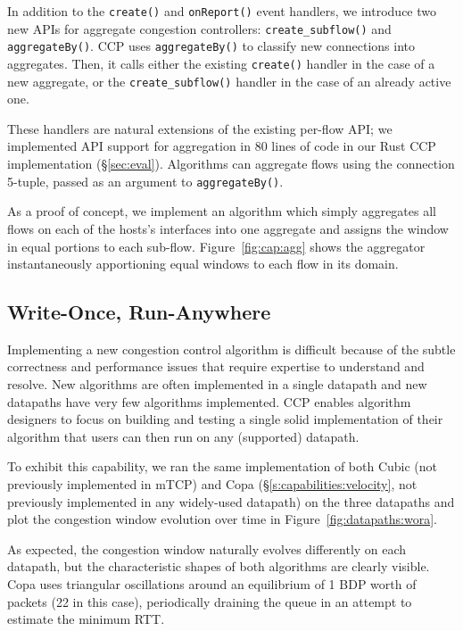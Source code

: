 %

 In addition to the \texttt{create()} and \texttt{onReport()} event handlers, we introduce two new APIs for aggregate congestion controllers: \texttt{create\_subflow()} and \texttt{aggregateBy()}.
CCP uses \texttt{aggregateBy()} to classify new connections into aggregates. Then, it calls either the existing \texttt{create()} handler in the case of a new aggregate, or the \texttt{create\_subflow()} handler in the case of an already active one.

These handlers are natural extensions of the existing per-flow API; we implemented API support for aggregation in $80$ lines of code in our Rust CCP implementation (\S\ref{sec:eval}).
Algorithms can aggregate flows using the connection 5-tuple, passed as an argument to \texttt{aggregateBy()}.

As a proof of concept, we implement an algorithm which simply aggregates all flows on each of the hosts's interfaces into one aggregate and assigns the window in equal portions to each sub-flow.
Figure~\ref{fig:cap:agg} shows the aggregator instantaneously apportioning equal windows to each flow in its domain.

\subsection{Write-Once, Run-Anywhere}
\label{s:capabilities:wora}

Implementing a new congestion control algorithm is difficult because of the subtle correctness and performance issues that require expertise to understand and resolve. New algorithms are often implemented in a single datapath and new datapaths have very few algorithms implemented. 
CCP enables algorithm designers to focus on building and testing a single solid implementation of their algorithm that users can then run on any (supported) datapath. 

To exhibit this capability, we ran the same implementation of both Cubic (not previously implemented in mTCP) and Copa (\S\ref{s:capabilities:velocity}, not previously implemented in any widely-used datapath) on the three datapaths and plot the congestion window evolution over time in Figure~\ref{fig:datapaths:wora}.

As expected, the congestion window naturally evolves differently on each datapath, but the characteristic shapes of both algorithms are clearly visible. Copa uses triangular oscillations around an equilibrium of 1 BDP worth of packets (22 in this case), periodically draining the queue in an attempt to estimate the minimum RTT.